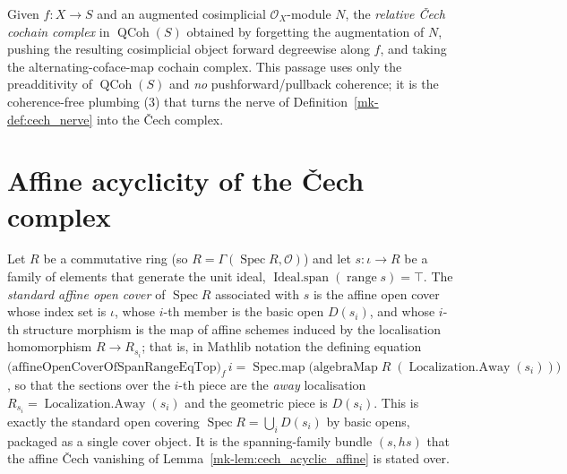 \begin{definition}\label{mk-def:relative_cech_complex_of_nerve}
  \leanok

  Given \(f : X \to S\) and an augmented cosimplicial \(\mathcal{O}_X\)-module
  \(N\), the \emph{relative {\v C}ech cochain complex} in \(\operatorname{QCoh}(S)\)
  obtained by forgetting the augmentation of \(N\), pushing the resulting
  cosimplicial object forward degreewise along \(f\), and taking the
  alternating-coface-map cochain complex. This passage uses only the preadditivity
  of \(\operatorname{QCoh}(S)\) and \emph{no} pushforward/pullback coherence; it is
  the coherence-free plumbing (3) that turns the nerve of
  Definition~\ref{mk-def:cech_nerve} into the {\v C}ech complex.
\end{definition}

\section{Affine acyclicity of the {\v C}ech complex}

\begin{definition}
  \label{mk-def:standard_affine_cover}
  \mathlibok

  Let \(R\) be a commutative ring (so \(R = \Gamma(\operatorname{Spec} R,
  \mathcal{O})\)) and let \(s : \iota \to R\) be a family of elements that generate
  the unit ideal, \(\operatorname{Ideal.span}(\operatorname{range} s) = \top\). The
  \emph{standard affine open cover} of \(\operatorname{Spec} R\) associated with
  \(s\) is the affine open cover whose index set is \(\iota\), whose \(i\)-th member
  is the basic open \(D(s_i)\), and whose \(i\)-th structure morphism is the map of
  affine schemes induced by the localisation homomorphism \(R \to R_{s_i}\); that
  is, in Mathlib notation the defining equation
  \(\bigl(\text{affineOpenCoverOfSpanRangeEqTop}\bigr)_f\, i =
  \operatorname{Spec.map}\bigl(\text{algebraMap}\; R\; (\operatorname{Localization.Away}(s_i))\bigr)\),
  so that the sections over the \(i\)-th piece are the \emph{away} localisation
  \(R_{s_i} = \operatorname{Localization.Away}(s_i)\) and the geometric piece is
  \(D(s_i)\). This is exactly the standard open covering
  \(\operatorname{Spec} R = \bigcup_i D(s_i)\) by basic opens, packaged as a single
  cover object. It is the spanning-family bundle \((s, hs)\) that the affine
  {\v C}ech vanishing of Lemma~\ref{mk-lem:cech_acyclic_affine} is stated over.
\end{definition}

